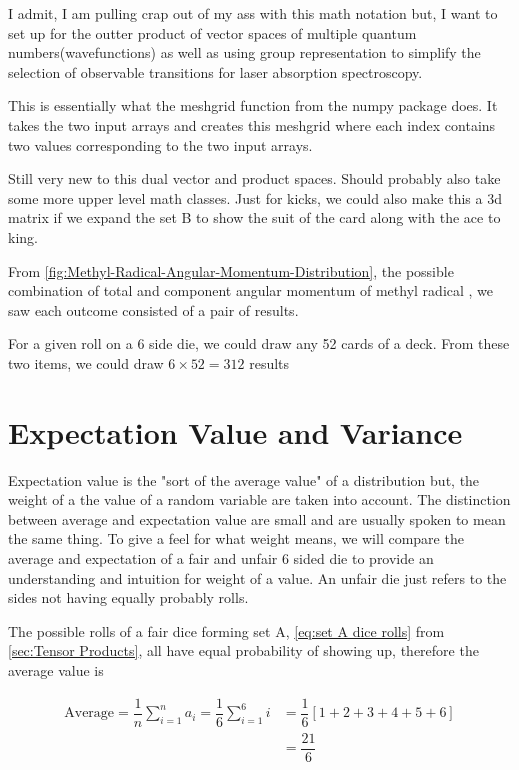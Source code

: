 \documentclass[11pt,a4paper]{book}
\begin{document}
		I admit, I am pulling crap out of my ass with this math notation but, I want to set up for the outter product of vector spaces of multiple quantum numbers(wavefunctions) as well as using group representation to simplify the selection of observable transitions for laser absorption spectroscopy. 
		
		This is essentially what the meshgrid function from the numpy package does. It takes the two input arrays and creates this meshgrid where each index contains two values corresponding to the two input arrays. 
		
		Still very new to this dual vector and product spaces. Should probably also take some more upper level math classes. Just for kicks, we could also make this a 3d matrix if we expand the set B to show the suit of the card along with the ace to king.
		
		From \autoref{fig:Methyl-Radical-Angular-Momentum-Distribution}, the possible combination of total and component angular momentum of methyl radical , we saw each outcome consisted of a pair of results.
		
		For a given roll on a 6 side die, we could draw any 52 cards of a deck. From these two items, we could draw $6\times52=312$ results
	\section{Expectation Value and Variance}
		\label{Fundamentals of Probabilty and Statistics}
		Expectation value is the "sort of the average value" of a distribution but, the weight of a the value of a random variable are taken into account. The distinction between average and expectation value are small and are usually spoken to mean the same thing. To give a feel for what weight means, we will compare the average and expectation of a fair and unfair 6 sided die to provide an understanding and intuition for weight of a value. An unfair die just refers to the sides not having equally probably rolls. 
		
		The possible rolls of a fair dice forming set A, \autoref{eq:set A dice rolls} from \autoref{sec:Tensor Products}, all have equal probability of showing up, therefore the average value is
		
		\begin{equation}
			\label{average value of set A fair dice}
			\begin{split}
				\text{Average} = \dfrac{1}{n}\sum_{i=1}^n{a_i} = \dfrac{1}{6}\sum_{i=1}^6{i} 
				&= \dfrac{1}{6}\left[1+2+3+4+5+6\right]\\
				&= \dfrac{21}{6} \\
			\end{split}
		\end{equation}
		
\end{document}
